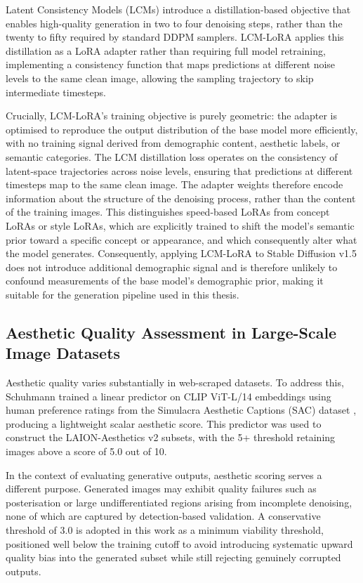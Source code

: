 Latent Consistency Models (LCMs) \cite{Song_2023_LCM} introduce a distillation-based
objective that enables high-quality generation in two to four denoising steps, rather than
the twenty to fifty required by standard DDPM samplers. LCM-LoRA \cite{Luo_2023_LCMLoRA}
applies this distillation as a LoRA adapter rather than requiring full model retraining,
implementing a consistency function that maps predictions at different noise levels to the
same clean image, allowing the sampling trajectory to skip intermediate timesteps.

Crucially, LCM-LoRA's training objective is purely geometric: the adapter is optimised
to reproduce the output distribution of the base model more efficiently, with no training
signal derived from demographic content, aesthetic labels, or semantic categories. The
LCM distillation loss operates on the consistency of latent-space trajectories across
noise levels, ensuring that predictions at different timesteps map to the same clean
image. The adapter weights therefore encode information about the structure of the
denoising process, rather than the content of the training images. This distinguishes
speed-based LoRAs from concept LoRAs or style LoRAs, which are explicitly
trained to shift the model's semantic prior toward a specific concept or appearance, and
which consequently alter what the model generates. Consequently, applying LCM-LoRA to
Stable Diffusion v1.5 does not introduce additional demographic signal and is therefore
unlikely to confound measurements of the base model's demographic prior, making it
suitable for the generation pipeline used in this thesis.

\subsection{Aesthetic Quality Assessment in Large-Scale Image Datasets}
\label{subsec:aesthetic_scoring}

Aesthetic quality varies substantially in web-scraped datasets. To address this, Schuhmann
\cite{Schuhmann_2022_LaionAesthetics} trained a linear predictor on CLIP ViT-L/14
embeddings using human preference ratings from the Simulacra Aesthetic Captions (SAC)
dataset \cite{Pressman_2022_SAC}, producing a lightweight scalar aesthetic score. This
predictor was used to construct the LAION-Aesthetics v2 subsets, with the 5+ threshold
retaining images above a score of 5.0 out of 10.

In the context of evaluating generative outputs, aesthetic scoring serves a different
purpose. Generated images may exhibit quality failures such as posterisation or large
undifferentiated regions arising from incomplete denoising, none of which are captured
by detection-based validation. A conservative threshold of 3.0 is adopted in this work
as a minimum viability threshold, positioned well below the training cutoff to avoid
introducing systematic upward quality bias into the generated subset while still
rejecting genuinely corrupted outputs.

